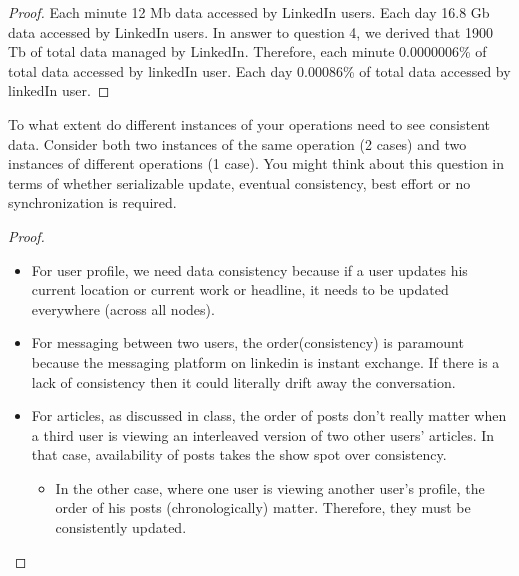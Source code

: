 \documentclass[12pt]{article}
\newenvironment{problem}[2][Problem]{\begin{trivlist}
\item[\hskip \labelsep {\bfseries #1}\hskip \labelsep {\bfseries #2.}]}{\end{trivlist}}
\begin{document}
\begin{proof}
Each minute 12 Mb data accessed by LinkedIn users. Each day 16.8 Gb data accessed by LinkedIn users. 
In answer to question 4, we derived that 1900 Tb of total data managed by LinkedIn.
Therefore, each minute 0.0000006\% of total data accessed by linkedIn user.
Each day 0.00086\% of total data accessed by linkedIn user.

\end{proof}
\begin{problem}{10}
To what extent do different instances of your operations need to see consistent data. Consider both two instances of the same operation (2 cases) and two instances of different operations (1 case). You might think about this question in terms of whether serializable update, eventual consistency, best effort or no synchronization is required.
\end{problem}
 
\begin{proof}
\begin{itemize}
\item For user profile, we need data consistency because if a user updates his current location or current work or headline, it needs to be updated everywhere (across all nodes).
\item For messaging between two users, the order(consistency) is paramount because the messaging platform on linkedin is instant exchange. If there is a lack of consistency then it could literally drift away the conversation. 
\item For articles, as discussed in class, the order of posts don’t really matter when a third user is viewing an interleaved version of two other users’ articles. In that case, availability of posts takes the show spot over consistency. 
	\begin{itemize}
	\item In the other case, where one user is viewing another user’s profile, the order of his posts (chronologically) matter. Therefore, they must be consistently updated. 

	\end{itemize}
\end{itemize}
\end{proof}
\end{document}
